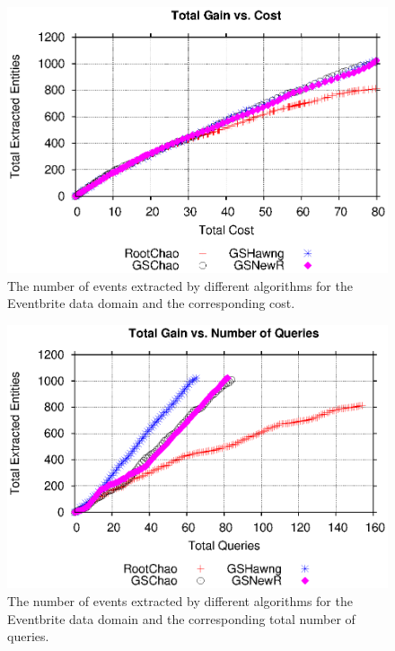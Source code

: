 \iftr
\begin{figure}[h]
	\begin{center}
	\includegraphics[clip,scale=0.5]{figs/gain_cost.eps}
	\caption{The number of events extracted by different algorithms for the Eventbrite data domain and the corresponding cost.}
	\label{fig:payasyougo}
	\end{center}
	\vspace{-15pt}
\end{figure}
\fi
\iftr
\begin{figure}[h]
	\begin{center}
	\includegraphics[clip,scale=0.5]{figs/gain_rounds.eps}
	\caption{The number of events extracted by different algorithms for the Eventbrite data domain and the corresponding total number of queries.}
	\label{fig:rounds}
	\end{center}
	\vspace{-15pt}
\end{figure}
